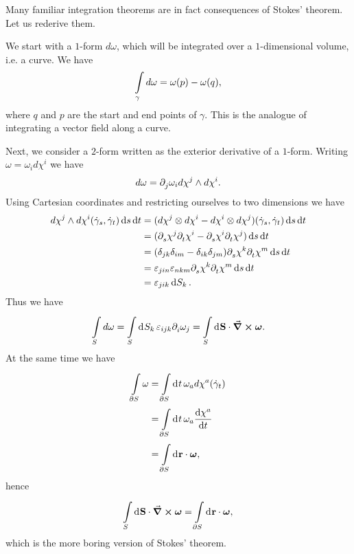 Many familiar integration theorems are in fact consequences of Stokes' theorem. Let us rederive them.

We start with a $1$-form $d\omega$, which will be integrated over a $1$-dimensional volume, i.e. a curve. We have
\begin{align*}
\int\limits_{\gamma}d\omega = \omega(p) - \omega(q),
\end{align*}
where $q$ and $p$ are the start and end points of $\gamma$. This is the analogue of integrating a vector field along a curve.

Next, we consider a $2$-form written as the exterior derivative of a $1$-form. Writing $\omega = \omega_{i}d\chi^{i}$ we have
\begin{align*}
d\omega = \partial^{}_{j}\omega_{i}d\chi^{j}\wedge d\chi^{i}.
\end{align*}
Using Cartesian coordinates and restricting ourselves to two dimensions we have
\begin{align*}
d\chi^{j}\wedge d\chi^{i}(\dot{\gamma}_{s}, \dot{\gamma}_{t})\dd{s}\dd{t} &= (d\chi^{j}\otimes d\chi^{i} - d\chi^{i}\otimes d\chi^{j})(\dot{\gamma}_{s}, \dot{\gamma}_{t})\dd{s}\dd{t} \\
&= (\partial^{}_{s}\chi^{j}\partial^{}_{t}\chi^{i} - \partial^{}_{s}\chi^{i}\partial^{}_{t}\chi^{j})\dd{s}\dd{t} \\
&= (\delta_{jk}\delta_{im} - \delta_{ik}\delta_{jm})\partial^{}_{s}\chi^{k}\partial^{}_{t}\chi^{m}\dd{s}\dd{t} \\
&= \varepsilon_{jin}\varepsilon_{nkm}\partial^{}_{s}\chi^{k}\partial^{}_{t}\chi^{m}\dd{s}\dd{t} \\
&= \varepsilon_{jik}\dd{S_{k}}.
\end{align*}
Thus we have
\begin{align*}
\int\limits_{S}d\omega = \int\limits_{S}^{}\dd[]{S_{k}}\varepsilon_{ijk}\partial^{}_{i}\omega_{j} = \int\limits_{S}^{}\dd[]{\vb{S}}\cdot\curl{\vb*{\omega}}.
\end{align*}
At the same time we have
\begin{align*}
\int\limits_{\partial S}\omega &= \int\limits_{\partial S}^{}\dd[]{t}\omega_{a}d\chi^{a}(\dot{\gamma}_{t}) \\
&= \int\limits_{\partial S}^{}\dd[]{t}\omega_{a}\dv{\chi^{a}}{t} \\
&= \int\limits_{\partial S}^{}\dd[]{\vb{r}}\cdot\vb*{\omega},
\end{align*}
hence
\begin{align*}
\int\limits_{S}^{}\dd[]{\vb{S}}\cdot\curl{\vb*{\omega}} = \int\limits_{\partial S}^{}\dd[]{\vb{r}}\cdot\vb*{\omega},
\end{align*}
which is the more boring version of Stokes' theorem.

